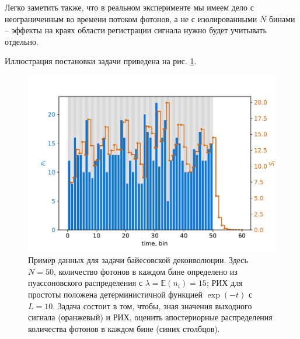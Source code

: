 \documentclass[12pt]{article}
\begin{document}
	Легко заметить также, что в реальном эксперименте мы имеем дело с неограниченным во времени потоком фотонов, а не с изолированными $N$ бинами -- эффекты на краях области регистрации сигнала нужно будет учитывать отдельно.
	
	Иллюстрация постановки задачи приведена на рис. \ref{pic:problem-setup}.
	
	\begin{figure}[H]
		\centering
		\includegraphics[width=\columnwidth]{problem-setup-example}
		\caption{Пример данных для задачи байесовской деконволюции. Здесь $N = 50$, количество фотонов в каждом бине определено из пуассоновского распределения с $\lambda = \mathbb{E}(n_i) = 15$; РИХ для простоты положена детерминистичной функцией $\exp(-t)$ с $L = 10$. Задача состоит в том, чтобы, зная значения выходного сигнала (оранжевый) и РИХ, оценить апостериорные распределения количества фотонов в каждом бине (синих столбцов).}
		\label{pic:problem-setup}
	\end{figure}
	
\end{document}
